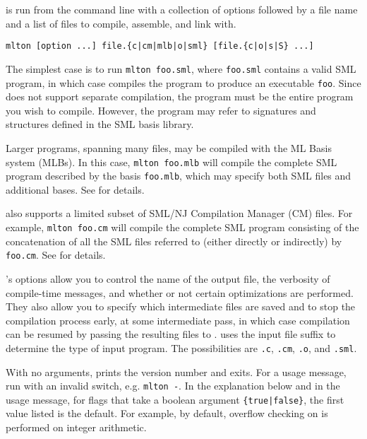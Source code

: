 %
{\mlton} is run from the command line with a collection of options
followed by a file name and a list of files to compile, assemble, and
link with.
\begin{verbatim}
mlton [option ...] file.{c|cm|mlb|o|sml} [file.{c|o|s|S} ...]
\end{verbatim}
The simplest case is to run {\tt mlton foo.sml}, where {\tt foo.sml}
contains a valid SML program, in which case {\mlton} compiles the
program to produce an executable {\tt foo}.  Since {\mlton} does not
support separate compilation, the program must be the entire
program you wish to compile.  However, the program may refer to
signatures and structures defined in the SML basis library.

Larger programs, spanning many files, may be compiled with the ML
Basis system (MLBs).  In this case, {\tt mlton foo.mlb} will compile
the complete SML program described by the basis {\tt foo.mlb}, which
may specify both SML files and additional bases.  See  for
details.

{\mlton} also supports a limited subset of SML/NJ Compilation Manager
(CM) files.  For example, {\tt mlton foo.cm} will compile the complete
SML program consisting of the concatenation of all the SML files
referred to (either directly or indirectly) by {\tt foo.cm}.  See
 for details.
%

{\mlton}'s options allow you to control the name of the output file,
the verbosity of compile-time messages, and whether or not certain
optimizations are performed.  They also allow you to specify which
intermediate files are saved and to stop the compilation process
early, at some intermediate pass, in which case compilation can be
resumed by passing the resulting files to {\mlton}.  {\mlton} uses the
input file suffix to determine the type of input program.  The
possibilities are {\tt .c}, {\tt .cm}, {\tt .o}, and {\tt .sml}.

With no arguments, {\mlton} prints the version number and exits.  For
a usage message, run {\mlton} with an invalid switch, e.g. {\tt mlton
-}.  In the explanation below and in the usage message, for flags
that take a boolean argument {\tt \{true|false\}}, the first value
listed is the default.  For example, by default, overflow checking on
is performed on integer arithmetic.

\newcommand{\option}[1]{\item[{\tt #1}]\hspace{1em}\\}
\newcommand{\choices}{{\it \{}}
\newcommand{\choice}{{\it |}}
\renewcommand{\choice}{|}
\newcommand{\choicesEnd}{{\it \}}}
\newcommand{\choiceTwo}[2]{\choices #1\choice #2\choicesEnd}
\newcommand{\choiceThree}[3]{\choices #1\choice #2\choice #3\choicesEnd}
\newcommand{\choiceFour}[4]{\choices #1\choice #2\choice #3\choice #4\choicesEnd}
\newcommand{\choiceSix}[6]
	   {\choices #1\choice #2\choice #3\choice #4\choice #5\choice
            #6\choicesEnd}
\newcommand{\falseTrue}{\choiceTwo{false}{true}}
\newcommand{\trueFalse}{\choiceTwo{true}{false}}


